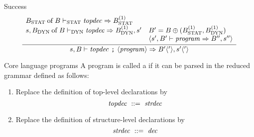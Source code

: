 \begin{inference-rule}{Success}
\begin{equation}\label{rule:programs:success}
\vcenter{\infer{\s,\B\ts\longprog\ra\B'\optional{'},\s'\optional{'}}
  {\begin{array}{ll}
    \of{\Bstat}{\B}\tsstat\topdec\ra\Bstat^{(1)} & \\
    \s,\of{\Bdyn}{\B}\tsdyn\topdec\ra\Bdyn^{(1)},s'&
                \B'=\B\oplus(\Bstat^{(1)},\Bdyn^{(1)})\\
    &           \optional{\s',\B'\ts\program\ra\B'',s''}
   \end{array}}}
\end{equation}
\end{inference-rule}

\begin{definition}{Core language programs}
A program is called a  if it can be parsed
in the reduced grammar defined as follows:
\begin{enumerate}
\item Replace the definition of top-level declarations by
\begin{equation*}
\textit{topdec\/}\ ::=\ \textit{strdec\/}
\end{equation*}
\item Replace the definition of structure-level declarations by
\begin{equation*}
\textit{strdec\/}\ ::=\ \textit{dec\/}
\end{equation*}
\end{enumerate}
\end{definition}
